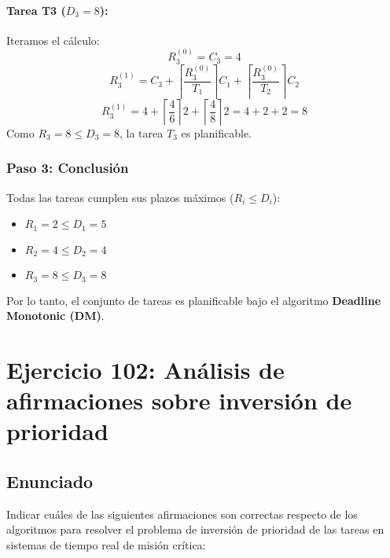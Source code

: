 \documentclass[a4paper,12pt]{article}
\begin{document}
\paragraph{Tarea T3 (\(D_3 = 8\)):}
Iteramos el cálculo:
\[
R_3^{(0)} = C_3 = 4
\]
\[
R_3^{(1)} = C_3 + \left\lceil \frac{R_3^{(0)}}{T_1} \right\rceil C_1 + \left\lceil \frac{R_3^{(0)}}{T_2} \right\rceil C_2
\]
\[
R_3^{(1)} = 4 + \left\lceil \frac{4}{6} \right\rceil 2 + \left\lceil \frac{4}{8} \right\rceil 2 = 4 + 2 + 2 = 8
\]
Como \(R_3 = 8 \leq D_3 = 8\), la tarea \(T_3\) es planificable.

\subsubsection{Paso 3: Conclusión}
Todas las tareas cumplen sus plazos máximos (\(R_i \leq D_i\)):
\begin{itemize}
    \item \(R_1 = 2 \leq D_1 = 5\)
    \item \(R_2 = 4 \leq D_2 = 4\)
    \item \(R_3 = 8 \leq D_3 = 8\)
\end{itemize}
Por lo tanto, el conjunto de tareas es planificable bajo el algoritmo \textbf{Deadline Monotonic (DM)}.

\section{Ejercicio 102: Análisis de afirmaciones sobre inversión de prioridad}
\subsection{Enunciado}
Indicar cuáles de las siguientes afirmaciones son correctas respecto de los algoritmos para resolver el problema de inversión de prioridad de las tareas en sistemas de tiempo real de misión crítica:
\end{document}

